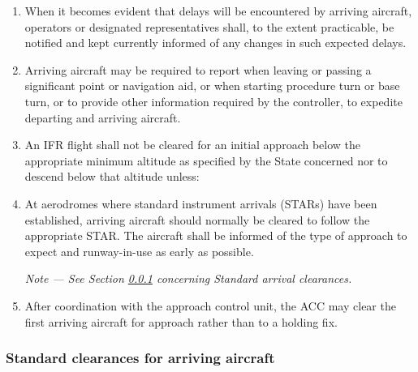 \documentclass[../main.tex]{subfiles}
\begin{document}
    \begin{enumerate}
        \item When it becomes evident that delays will be encountered by arriving aircraft, operators or designated representatives shall, to the extent practicable, be notified and kept currently informed of any changes in such expected delays.
        \item Arriving aircraft may be required to report when leaving or passing a significant point or navigation aid, or when starting procedure turn or base turn, or to provide other information required by the controller, to expedite departing and arriving aircraft.
        \item An IFR flight shall not be cleared for an initial approach below the appropriate minimum altitude as specified by the State concerned nor to descend below that altitude unless:


        \item At aerodromes where standard instrument arrivals (STARs) have been established, arriving aircraft should normally be cleared to follow the appropriate STAR. The aircraft shall be informed of the type of approach to expect and runway-in-use as early as possible.

        \textit{Note --- See Section \ref{6.5.2} concerning Standard arrival clearances.}

        \item After coordination with the approach control unit, the ACC may clear the first arriving aircraft for approach rather than to a holding fix.
    \end{enumerate}

    \subsubsection{Standard clearances for arriving aircraft} \label{6.5.2}
\end{document}
